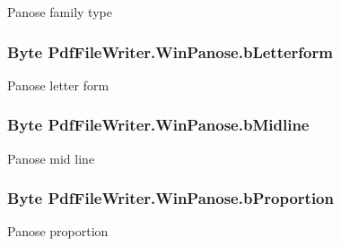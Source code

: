 Panose family type 

\subsubsection[{\texorpdfstring{b\+Letterform}{bLetterform}}]{\setlength{\rightskip}{0pt plus 5cm}Byte Pdf\+File\+Writer.\+Win\+Panose.\+b\+Letterform\hspace{0.3cm}{\ttfamily [get]}}\hypertarget{class_pdf_file_writer_1_1_win_panose_a7276b354af20a5744351b1dc4c2141ec}{}\label{class_pdf_file_writer_1_1_win_panose_a7276b354af20a5744351b1dc4c2141ec}


Panose letter form 

\subsubsection[{\texorpdfstring{b\+Midline}{bMidline}}]{\setlength{\rightskip}{0pt plus 5cm}Byte Pdf\+File\+Writer.\+Win\+Panose.\+b\+Midline\hspace{0.3cm}{\ttfamily [get]}}\hypertarget{class_pdf_file_writer_1_1_win_panose_a9f167b8d35c2cd0992a6a0ce2e57d1df}{}\label{class_pdf_file_writer_1_1_win_panose_a9f167b8d35c2cd0992a6a0ce2e57d1df}


Panose mid line 

\subsubsection[{\texorpdfstring{b\+Proportion}{bProportion}}]{\setlength{\rightskip}{0pt plus 5cm}Byte Pdf\+File\+Writer.\+Win\+Panose.\+b\+Proportion\hspace{0.3cm}{\ttfamily [get]}}\hypertarget{class_pdf_file_writer_1_1_win_panose_aac3885eca66527b4285c3c29c8608b98}{}\label{class_pdf_file_writer_1_1_win_panose_aac3885eca66527b4285c3c29c8608b98}


Panose proportion 

